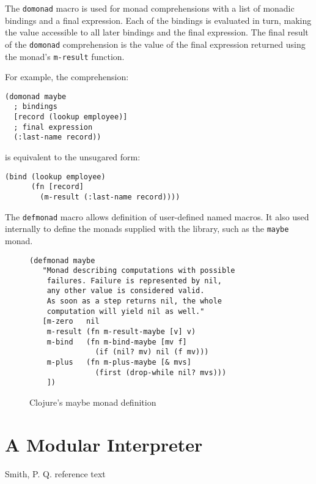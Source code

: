 \documentclass[preprint,natbib,10pt]{sigplanconf}
\begin{document}
The {\tt domonad} macro is used for monad comprehensions with a list
of monadic bindings and a final expression.  Each of the bindings is
evaluated in turn, making the value accessible to all later bindings
and the final expression.  The final result of the {\tt domonad}
comprehension is the value of the final expression returned using
the monad's {\tt m-result} function.

For example, the comprehension:
\begin{verbatim}
(domonad maybe
  ; bindings
  [record (lookup employee)]
  ; final expression
  (:last-name record))
\end{verbatim}
is equivalent to the unsugared form:
\begin{verbatim}
(bind (lookup employee)
      (fn [record]
        (m-result (:last-name record))))
\end{verbatim}

The {\tt defmonad} macro allows definition of user-defined named
macros.  It also used internally to define the monads supplied
with the library, such as the {\tt maybe} monad.

\begin{figure}
\begin{center}
\begin{verbatim}
(defmonad maybe
   "Monad describing computations with possible
    failures. Failure is represented by nil,
    any other value is considered valid.
    As soon as a step returns nil, the whole
    computation will yield nil as well."
   [m-zero   nil
    m-result (fn m-result-maybe [v] v)
    m-bind   (fn m-bind-maybe [mv f]
               (if (nil? mv) nil (f mv)))
    m-plus   (fn m-plus-maybe [& mvs]
               (first (drop-while nil? mvs)))
    ])

\end{verbatim}
\end{center}
\caption{Clojure's maybe monad definition}
\label{fig-Clojure-maybe-defn}
\end{figure}



\section{A Modular Interpreter}







\begin{thebibliography}{}

Smith, P. Q. reference text

\end{thebibliography}
\end{document}
